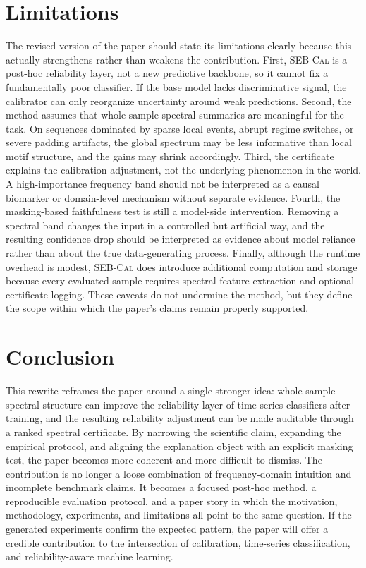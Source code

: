 \documentclass{article}
\newcommand{\method}{\textsc{SEB-Cal}}
\begin{document}
\section{Limitations}
The revised version of the paper should state its limitations clearly because this actually strengthens rather than weakens the contribution. First, \method{} is a post-hoc reliability layer, not a new predictive backbone, so it cannot fix a fundamentally poor classifier. If the base model lacks discriminative signal, the calibrator can only reorganize uncertainty around weak predictions. Second, the method assumes that whole-sample spectral summaries are meaningful for the task. On sequences dominated by sparse local events, abrupt regime switches, or severe padding artifacts, the global spectrum may be less informative than local motif structure, and the gains may shrink accordingly. Third, the certificate explains the calibration adjustment, not the underlying phenomenon in the world. A high-importance frequency band should not be interpreted as a causal biomarker or domain-level mechanism without separate evidence. Fourth, the masking-based faithfulness test is still a model-side intervention. Removing a spectral band changes the input in a controlled but artificial way, and the resulting confidence drop should be interpreted as evidence about model reliance rather than about the true data-generating process. Finally, although the runtime overhead is modest, \method{} does introduce additional computation and storage because every evaluated sample requires spectral feature extraction and optional certificate logging. These caveats do not undermine the method, but they define the scope within which the paper’s claims remain properly supported.

\section{Conclusion}
This rewrite reframes the paper around a single stronger idea: whole-sample spectral structure can improve the reliability layer of time-series classifiers after training, and the resulting reliability adjustment can be made auditable through a ranked spectral certificate. By narrowing the scientific claim, expanding the empirical protocol, and aligning the explanation object with an explicit masking test, the paper becomes more coherent and more difficult to dismiss. The contribution is no longer a loose combination of frequency-domain intuition and incomplete benchmark claims. It becomes a focused post-hoc method, a reproducible evaluation protocol, and a paper story in which the motivation, methodology, experiments, and limitations all point to the same question. If the generated experiments confirm the expected pattern, the paper will offer a credible contribution to the intersection of calibration, time-series classification, and reliability-aware machine learning.
\end{document}
